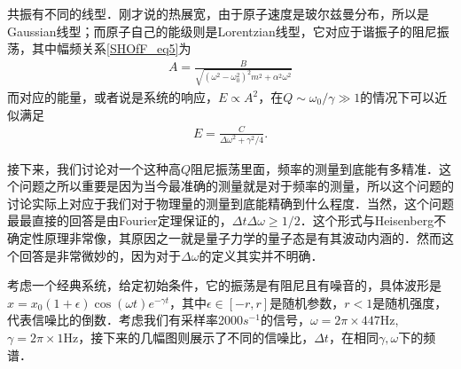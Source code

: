 共振有不同的线型．刚才说的热展宽，由于原子速度是玻尔兹曼分布，所以是Gaussian线型；而原子自己的能级则是Lorentzian线型，它对应于谐振子的阻尼振荡，其中幅频关系\autoref{SHOfF_eq5}为
\begin{align}
A = \frac{B}{\sqrt{(\omega^2 - \omega_0^2)^2 m^2 + \alpha^2\omega^2}}
\end{align}
而对应的能量，或者说是系统的响应，$E\propto A^2$，在$Q\sim\omega_0/\gamma\gg1$的情况下可以近似满足
\begin{align}
E = \frac{C}{\Delta\omega^2 + \gamma^2/4}. 
\end{align}

接下来，我们讨论对一个这种高$Q$阻尼振荡里面，频率的测量到底能有多精准．这个问题之所以重要是因为当今最准确的测量就是对于频率的测量，所以这个问题的讨论实际上对应于我们对于物理量的测量到底能精确到什么程度．当然，这个问题最最直接的回答是由Fourier定理保证的，$\Delta t\Delta \omega\ge1/2$．这个形式与Heisenberg不确定性原理非常像，其原因之一就是量子力学的量子态是有其波动内涵的．然而这个回答是非常微妙的，因为对于$\Delta\omega$的定义其实并不明确．

考虑一个经典系统，给定初始条件，它的振荡是有阻尼且有噪音的，具体波形是$x=x_0(1+\epsilon)\cos(\omega t)e^{-\gamma t}$，其中$\epsilon\in[-r,r]$是随机参数，$r<1$是随机强度，代表信噪比的倒数．考虑我们有采样率2000$s^{-1}$的信号，$\omega=2\pi\times447$Hz, $\gamma=2\pi\times1$Hz，接下来的几幅图则展示了不同的信噪比，$\Delta t$，在相同$\gamma, \omega$下的频谱．


















